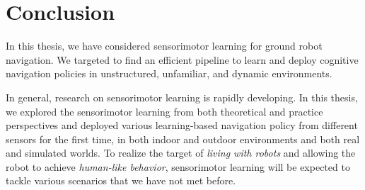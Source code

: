 \chapter{Conclusion}
\label{ch:conclusion}

In this thesis, we have considered sensorimotor learning for ground robot navigation. We targeted to find an efficient pipeline to learn and deploy cognitive navigation policies in unstructured, unfamiliar, and dynamic environments.

% 
% 
% 



In general, research on sensorimotor learning is rapidly developing.
In this thesis, we explored the sensorimotor learning from both theoretical and practice perspectives and deployed various learning-based navigation policy from different sensors for the first time, in both indoor and outdoor environments and both real and simulated worlds.
To realize the target of \textit{living with robots} and allowing the robot to achieve \textit{human-like behavior}, sensorimotor learning will be expected to tackle various scenarios that we have not met before.
